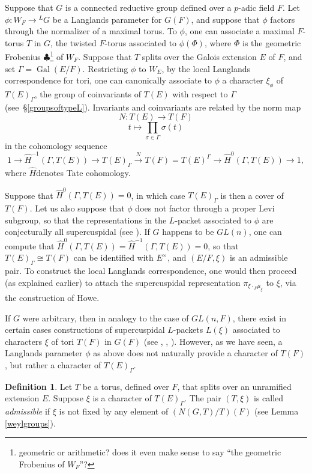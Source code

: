\documentclass[11pt]{amsart}
\theoremstyle{plain}
\newcommand{\MAxxx}[1]{$\clubsuit$\footnote{#1}}
\theoremstyle{definition}
\newtheorem{definition}[theorem]{Definition}
\DeclareMathOperator{\Gal}{Gal}
\begin{document}
Suppose that $G$ is a connected reductive group defined over a
$p$-adic field $F$.  Let $\phi : W_F \rightarrow {}^L G$ be a
Langlands parameter for $G(F)$, and suppose that $\phi$ factors
through the normalizer of a maximal torus. To $\phi$, one can
associate a maximal $F$-torus $T$ in $G$, the twisted $F$-torus
associated to $\phi(\Phi)$, where $\Phi$ is the geometric Frobenius
\MAxxx{geometric or arithmetic?  does it even make sense to say ``the
  geometric Frobenius of $W_F$''?} of $W_F$.  Suppose that $T$ splits
over the Galois extension $E$ of $F$, and set $\Gamma = \Gal(E/F)$.
Restricting $\phi$ to $W_E$, by the local Langlands correspondence for
tori, one can canonically associate to $\phi$ a character $\xi_{\phi}$
of $T(E)_{\Gamma}$, the group of coinvariants of $T(E)$ with respect
to $\Gamma$ (see~\S\ref{groupsoftypeL}).  Invariants and coinvariants
are related by the norm map
$$N : T(E) \rightarrow T(F)$$ $$t \mapsto \displaystyle\prod_{\sigma \in \Gamma} \sigma(t)$$
in the cohomology sequence
$$1 \rightarrow \hat{H}^{-1}(\Gamma,T(E)) \rightarrow T(E)_{\Gamma} \xrightarrow{N} T(F)
= T(E)^{\Gamma} \rightarrow \hat{H}^0(\Gamma,T(E)) \rightarrow 1,$$
where $\hat{H}$denotes Tate cohomology.

Suppose that $\hat{H}^0(\Gamma, T(E)) = 0$, in which case
$T(E)_{\Gamma}$ is then a cover of $T(F)$.  Let us also suppose that
$\phi$ does not factor through a proper Levi subgroup, so that the
representations in the $L$-packet associated to $\phi$ are
conjecturally all supercuspidal (see \cite[\S 3.5]{debackerreeder}).
If $G$ happens to be $GL(n)$, one can compute that
$\hat{H}^{0}(\Gamma, T(E)) = \hat{H}^{-1}(\Gamma, T(E)) = 0$, so that
$T(E)_{\Gamma} \cong T(F)$ can be identified with $E^{\times}$, and
$(E/F, \xi)$ is an admissible pair.  To construct the local Langlands
correspondence, one would then proceed (as explained earlier) to
attach the supercuspidal representation $\pi_{\xi \cdot {}_F
  \mu_{\xi}}$ to $\xi$, via the construction of Howe.

If $G$ were arbitrary, then in analogy to the case of $GL(n,F)$, there
exist in certain cases constructions of supercuspidal $L$-packets
$L(\xi)$ associated to characters $\xi$ of tori $T(F)$ in $G(F)$ (see
\cite{debackerreeder}, \cite{kaletha}, \cite{reeder}).  However, as we
have seen, a Langlands parameter $\phi$ as above does not naturally
provide a character of $T(F)$, but rather a character of
$T(E)_{\Gamma}$.

\begin{definition}
Let $T$ be a torus, defined over $F$, that splits over an unramified
  extension $E$.  Suppose $\xi$ is a character of $T(E)_{\Gamma}$.
The pair $(T, \xi)$ is called \emph{admissible} if $\xi$ is not fixed
by any element of $(N(G,T)/T)(F)$ (see Lemma \ref{weylgroups}).
\end{definition}
\end{document}
